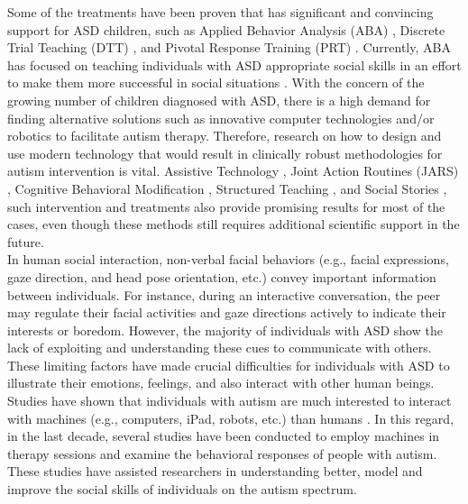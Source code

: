 Some of the treatments have been proven that has significant and convincing 
support for ASD children, such as Applied Behavior Analysis (ABA) \cite{cooper2007applied}, 
Discrete Trial Teaching (DTT) \cite{sarokoff2004effects}, and Pivotal 
Response Training (PRT) \cite{pierce1995increasing}. Currently, 
ABA \cite{RollingRobot2002, MobileRobotic2002} has focused on teaching individuals with ASD
appropriate social skills in an effort to make them more successful in social situations \cite{wolff1964behavioural}.
With the concern of the growing number of children diagnosed with ASD, there is a high
demand for finding alternative solutions such as innovative computer technologies and/or
robotics to facilitate autism therapy. Therefore, research on how to design and use modern
technology that would result in clinically robust methodologies for autism intervention is
vital. Assistive Technology \cite{mirenda2001autism}, Joint Action Routines (JARS) \cite{drew2002pilot}, 
Cognitive Behavioral Modification \cite{epstein1989cognitive}, Structured Teaching \cite{schopler1995structured}, 
and Social Stories \cite{gray1993social,feng2013can, mavadati2014comparing}, 
such intervention and treatments also provide promising results for most of the cases, even 
though these methods still requires additional scientific support in the future. \cite{de2004autism}\\

In human social interaction, non-verbal facial behaviors (e.g., facial expressions,
gaze direction, and head pose orientation, etc.) convey important information between
individuals. For instance, during an interactive conversation, the peer may regulate their
facial activities and gaze directions actively to indicate their interests or boredom. However,
the majority of individuals with ASD show the lack of exploiting and understanding these
cues to communicate with others. These limiting factors have made crucial difficulties for
individuals with ASD to illustrate their emotions, feelings, and also interact with other
human beings. Studies have shown that individuals with autism are much interested to
interact with machines (e.g., computers, iPad, robots, etc.) than humans \cite{fong2003survey}. In this regard,
in the last decade, several studies have been conducted to employ machines in therapy
sessions and examine the behavioral responses of people with autism. These studies have
assisted researchers in understanding better, model and improve the social skills of individuals
on the autism spectrum.\\

